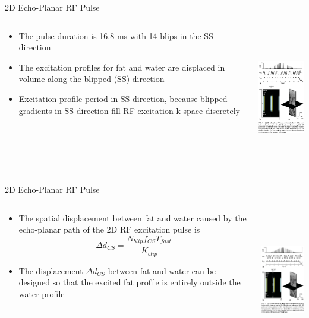 \documentclass{beamer}
\begin{document}
\begin{frame}{2D Echo-Planar RF Pulse}
\begin{columns}[T]
	\begin{column}[T]{5cm}
		\begin{itemize}
			\item The pulse duration is 16.8 ms with 14 blips in the SS direction
			\item The excitation profiles for fat and water are displaced in volume along the blipped (SS) direction
			\item Excitation profile period in SS direction, because blipped gradients in SS direction fill RF excitation k-space discretely
		\end{itemize}
	\end{column}
	\begin{column}[T]{5cm}
		\includegraphics[height=6cm]{SpineDWIfig1}
	\end{column}
\end{columns}
\end{frame}

\begin{frame}{2D Echo-Planar RF Pulse}
\begin{columns}[T]
	\begin{column}[T]{5cm}
		\begin{itemize}
			\item The spatial displacement between fat and water caused by the echo-planar path of the 2D RF excitation pulse is $$\Delta d_{CS}=\frac{N_{blip}f_{CS}T_{fast}}{K_{blip}}$$
			\item The displacement $\Delta d_{CS}$ between fat and water can be designed so that the excited fat profile is entirely outside the water profile
		\end{itemize}
	\end{column}
	\begin{column}[T]{5cm}
		\includegraphics[height=6cm]{SpineDWIfig1}
	\end{column}
\end{columns}
\end{frame}
\end{document}
